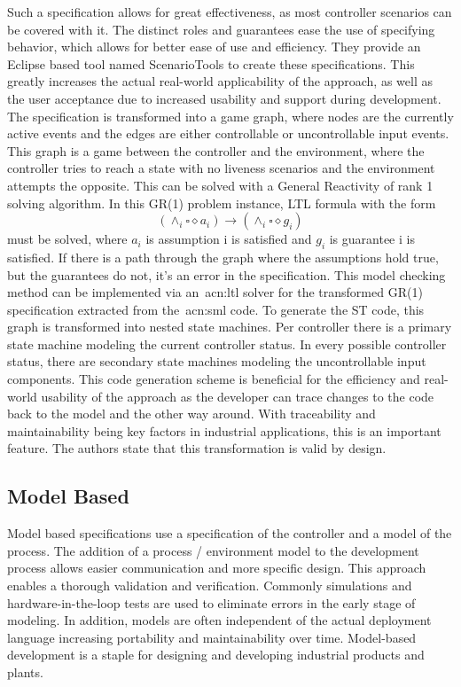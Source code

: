 Such a specification allows for great effectiveness, as most controller scenarios can be covered with it.
The distinct roles and guarantees ease the use of specifying behavior, which allows for better ease of use and efficiency.
They provide an Eclipse based tool named ScenarioTools to create these specifications.
This greatly increases the actual real-world applicability of the approach, as well as the user acceptance due to increased usability and support during development.
The specification is transformed into a game graph, where nodes are the currently active events and the edges are either controllable or uncontrollable input events.
This graph is a game between the controller and the environment, where the controller tries to reach a state with no liveness scenarios and the environment attempts the opposite.
This can be solved with a General Reactivity of rank 1 solving algorithm.
In this GR(1) problem instance, LTL formula with the form
\begin{equation}
\left(\land_{i}\square\diamond a_{i} \right) \rightarrow \left(\land_{i}\square\diamond g_{i} \right)
\end{equation}
must be solved, where $a_{i}$ is assumption i is satisfied and $g_{i}$ is guarantee i is satisfied.
If there is a path through the graph where the assumptions hold true, but the guarantees do not, it's an error in the specification.
This model checking method can be implemented via an~\acrshort{acn:ltl} solver for the transformed GR(1) specification extracted from the~\acrshort{acn:sml} code.
To generate the ST code, this graph is transformed into nested state machines.
Per controller there is a primary state machine modeling the current controller status.
In every possible controller status, there are secondary state machines modeling the uncontrollable input components.
This code generation scheme is beneficial for the efficiency and real-world usability of the approach as the developer can trace changes to the code back to the model and the other way around.
With traceability and maintainability being key factors in industrial applications, this is an important feature.
The authors state that this transformation is valid by design.

\subsection{Model Based}
\label{sec:sub:mb}

Model based specifications use a specification of the controller and a model of the process.
The addition of a process / environment model to the development process allows easier communication and more specific design.
This approach enables a thorough validation and verification.
Commonly simulations and hardware-in-the-loop tests are used to eliminate errors in the early stage of modeling.
In addition, models are often independent of the actual deployment language increasing portability and maintainability over time.
Model-based development is a staple for designing and developing industrial products and plants.

